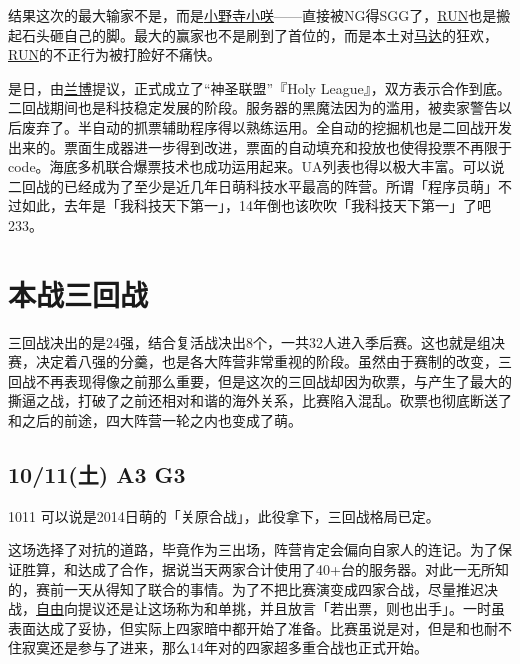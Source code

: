结果这次的最大输家不是，而是\uline{小野寺小咲}——直接被NG得SGG了，\uline{RUN}也是搬起石头砸自己的脚。最大的赢家也不是刷到了首位的，而是本土对\uline{马达}的狂欢，\uline{RUN}的不正行为被打脸好不痛快。

是日，由\uline{兰博}提议，正式成立了“神圣联盟”『Holy League』，双方表示合作到底。
\\

二回战期间也是科技稳定发展的阶段。服务器的黑魔法因为的滥用，被卖家警告以后废弃了。半自动的抓票辅助程序得以熟练运用。全自动的挖掘机也是二回战开发出来的。票面生成器进一步得到改进，票面的自动填充和投放也使得投票不再限于code。海底多机联合爆票技术也成功运用起来。UA列表也得以极大丰富。可以说二回战的已经成为了至少是近几年日萌科技水平最高的阵营。所谓「程序员萌」不过如此，去年是「我科技天下第一」，14年倒也该吹吹「我科技天下第一」了吧233。

\chapter{本战三回战}

三回战决出的是24强，结合复活战决出8个，一共32人进入季后赛。这也就是组决赛，决定着八强的分羹，也是各大阵营非常重视的阶段。虽然由于赛制的改变，三回战不再表现得像之前那么重要，但是这次的三回战却因为砍票，与产生了最大的撕逼之战，打破了之前还相对和谐的海外关系，比赛陷入混乱。砍票也彻底断送了和之后的前途，四大阵营一轮之内也变成了萌。

\section{10/11(土) A3 G3}

1011 可以说是2014日萌的「关原合战」，此役拿下，三回战格局已定。



这场选择了对抗的道路，毕竟作为三出场，阵营肯定会偏向自家人的连记。为了保证胜算，和达成了合作，据说当天两家合计使用了40+台的服务器。对此一无所知的，赛前一天从得知了联合的事情。为了不把比赛演变成四家合战，尽量推迟决战，\uline{自由}向提议还是让这场称为和单挑，并且放言「若出票，则也出手」。一时虽表面达成了妥协，但实际上四家暗中都开始了准备。比赛虽说是对，但是和也耐不住寂寞还是参与了进来，那么14年对的四家超多重合战也正式开始。

